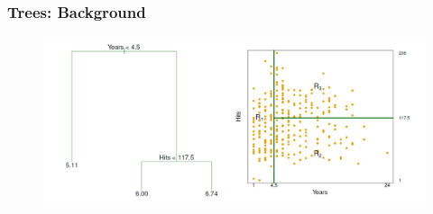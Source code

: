 \documentclass[
  shownotes,
  xcolor={svgnames},
  hyperref={colorlinks,citecolor=DarkBlue,linkcolor=DarkRed,urlcolor=DarkBlue}
  ]{beamer}
\begin{document}
\begin{frame}[fragile]
\frametitle{Trees: Background}



\begin{figure}[H] \centering
            \captionsetup{justification=centering}
              \includegraphics[scale=0.4]{figures/hitters.png}                           
 \end{figure}


\end{frame}
\end{document}
